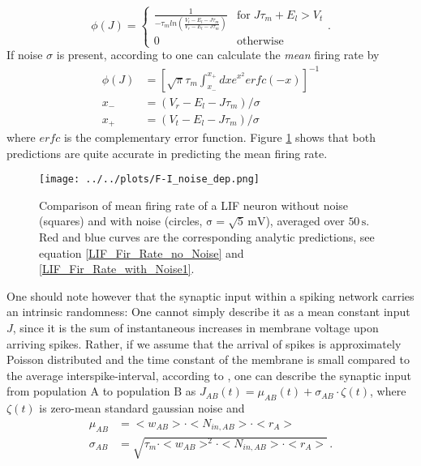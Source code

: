 \documentclass[10pt,a4paper]{article}
\begin{document}
\begin{equation}
\phi(J) = \begin{cases}\frac{1}{-\tau_m ln(\frac{V_t -E_l-J\tau_m}{V_r -E_l-J\tau_m})} & \mathrm{for}\; J\tau_m + E_l > V_t\\
0 & \mathrm{otherwise}
\end{cases}.
\label{LIF_Fir_Rate_no_Noise}
\end{equation}
If noise $\sigma$ is present, according to \cite{Roxin_Firing_Rate_Distribution} one can calculate the \emph{mean} firing rate by
\begin{align}
\phi(J) &= \left[ \sqrt{\pi}\tau_m \int_{x_-}^{x_+} dx e^{x^2} erfc(-x) \right]^{-1} \label{LIF_Fir_Rate_with_Noise1}\\
x_- &= (V_r-E_l-J\tau_m)/\sigma \label{LIF_Fir_Rate_with_Noise2}\\
x_+ &= (V_t-E_l-J\tau_m)/\sigma \label{LIF_Fir_Rate_with_Noise3}
\end{align}
where $erfc$ is the complementary error function. Figure \ref{F-I_noise_dep} shows that both predictions are quite accurate in predicting the mean firing rate. 
\begin{figure}
\begin{center}
\texttt{[image: ../../plots/F-I\_noise\_dep.png]}
\end{center}
\caption{Comparison of mean firing rate of a LIF neuron without noise (squares) and with noise (circles, $\mathrm{\sigma = \sqrt{5}\, mV}$), averaged over $\mathrm{50\, s}$. Red and blue curves are the corresponding analytic predictions, see equation \ref{LIF_Fir_Rate_no_Noise} and \ref{LIF_Fir_Rate_with_Noise1}.}
\label{F-I_noise_dep}
\end{figure}
One should note however that the synaptic input within a spiking network carries an intrinsic randomness: One cannot simply describe it as a mean constant input $J$, since it is the sum of instantaneous increases in membrane voltage upon arriving spikes. Rather, if we assume that the arrival of spikes is approximately Poisson distributed and the time constant of the membrane is small compared to the average interspike-interval, according to \cite{Roxin_Firing_Rate_Distribution}, one can describe the synaptic input from population $\mathrm{A}$ to population $\mathrm{B}$ as $J_{AB}(t) = \mu_{AB} (t) + \sigma_{AB} \cdot \zeta(t)$, where $\zeta(t)$ is zero-mean standard gaussian noise and
\begin{align}
\mu_{AB} &= <w_{AB}> \cdot <N_{in,AB}> \cdot <r_A> \label{Noise_Approx_1}\\
\sigma_{AB} &= \sqrt{\tau_m \cdot <w_{AB}>^2 \cdot <N_{in,AB}> \cdot <r_A>} \label{Noise_Approx_2} \, .
\end{align}
\end{document}
